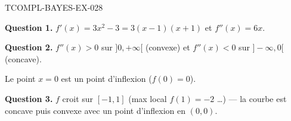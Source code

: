 \begin{corrige}{TCOMPL-BAYES-EX-028}

\textbf{Question 1.} $f'(x) = 3x^2 - 3 = 3(x-1)(x+1)$ et $f''(x) = 6x$.


\textbf{Question 2.} $f''(x) > 0$ sur $]0,+\infty[$ (convexe) et $f''(x) < 0$ sur $]-\infty,0[$ (concave).

Le point $x=0$ est un point d'inflexion ($f(0) = 0$).

\textbf{Question 3.} $f$ croit sur $[-1,1]$ (max local $f(1)=-2$ \ldots) — la courbe est concave puis convexe avec un point d'inflexion en $(0,0)$.

\end{corrige}
